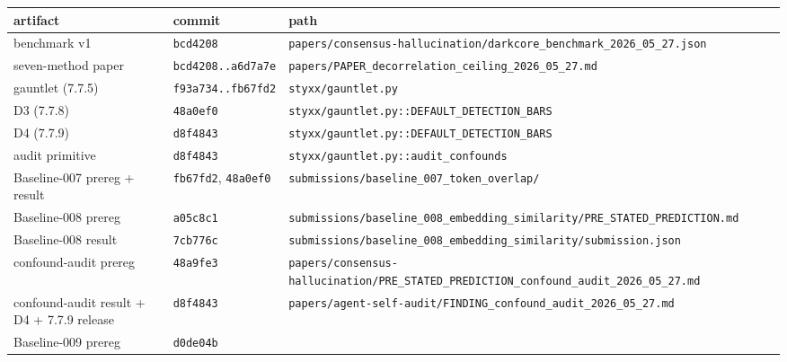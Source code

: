 \documentclass[
]{article}
\newcounter{none} %
\begin{document}
{\def\LTcaptype{none} %
\begin{longtable}[]{@{}
  >{\raggedright\arraybackslash}p{}
  >{\raggedright\arraybackslash}p{}
  >{\raggedright\arraybackslash}p{}@{}}
\toprule\noalign{}
\begin{minipage}[b]{\linewidth}\raggedright
artifact
\end{minipage} & \begin{minipage}[b]{\linewidth}\raggedright
commit
\end{minipage} & \begin{minipage}[b]{\linewidth}\raggedright
path
\end{minipage} \\
\midrule\noalign{}
\endhead
\bottomrule\noalign{}
\endlastfoot
benchmark v1 & \texttt{bcd4208} &
\texttt{papers/consensus-hallucination/darkcore\_benchmark\_2026\_05\_27.json} \\
seven-method paper & \texttt{bcd4208..a6d7a7e} &
\texttt{papers/PAPER\_decorrelation\_ceiling\_2026\_05\_27.md} \\
gauntlet (7.7.5) & \texttt{f93a734..fb67fd2} &
\texttt{styxx/gauntlet.py} \\
D3 (7.7.8) & \texttt{48a0ef0} &
\texttt{styxx/gauntlet.py::DEFAULT\_DETECTION\_BARS} \\
D4 (7.7.9) & \texttt{d8f4843} &
\texttt{styxx/gauntlet.py::DEFAULT\_DETECTION\_BARS} \\
audit primitive & \texttt{d8f4843} &
\texttt{styxx/gauntlet.py::audit\_confounds} \\
Baseline-007 prereg + result & \texttt{fb67fd2}, \texttt{48a0ef0} &
\texttt{submissions/baseline\_007\_token\_overlap/} \\
Baseline-008 prereg & \texttt{a05c8c1} &
\texttt{submissions/baseline\_008\_embedding\_similarity/PRE\_STATED\_PREDICTION.md} \\
Baseline-008 result & \texttt{7cb776c} &
\texttt{submissions/baseline\_008\_embedding\_similarity/submission.json} \\
confound-audit prereg & \texttt{48a9fe3} &
\texttt{papers/consensus-hallucination/PRE\_STATED\_PREDICTION\_confound\_audit\_2026\_05\_27.md} \\
confound-audit result + D4 + 7.7.9 release & \texttt{d8f4843} &
\texttt{papers/agent-self-audit/FINDING\_confound\_audit\_2026\_05\_27.md} \\
Baseline-009 prereg & \texttt{d0de04b} &

\end{longtable}}
\end{document}
